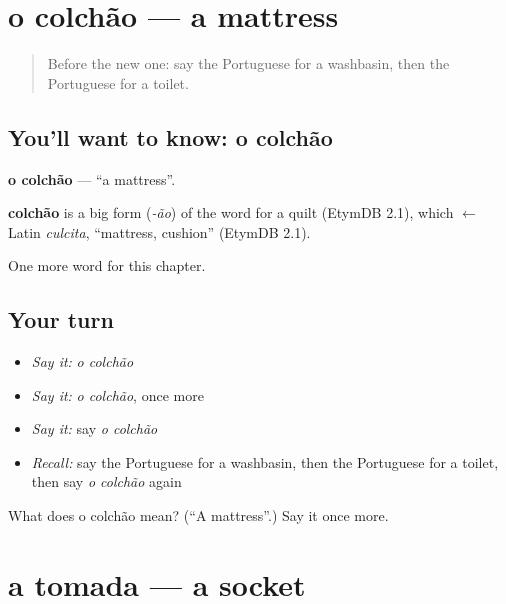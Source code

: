 \section[o colchão]{o colchão — a mattress}

\label{lesson:PT-C229-colchao}



\begin{quote}
Before the new one: say the Portuguese for a washbasin, then the Portuguese for a toilet.
\end{quote}

\subsection*{You'll want to know: o colchão}
\textbf{o colchão} — \textquotedblleft{}a mattress\textquotedblright{}.

\begin{cousinweb}
\textbf{colchão} is a big form (\emph{-ão}) of the word for a quilt (EtymDB 2.1), which $\leftarrow$ Latin \emph{culcita}, \textquotedblleft{}mattress, cushion\textquotedblright{} (EtymDB 2.1).
\end{cousinweb}

\begin{grammarlens}[title={What you've built}]
One more word for this chapter.
\end{grammarlens}

\subsection*{Your turn}
\begin{itemize}
\raggedright
  \item \emph{Say it:} \emph{o colchão}
  \item \emph{Say it:} \emph{o colchão}, once more
  \item \emph{Say it:} say \emph{o colchão}
  \item \emph{Recall:} say the Portuguese for a washbasin, then the Portuguese for a toilet, then say \emph{o colchão} again
\end{itemize}

\begin{tcolorbox}[breakable,colback=teal!4,colframe=teal!35!black,title={Before you move on}]
What does o colchão mean? (\textquotedblleft{}A mattress\textquotedblright{}.) Say it once more.
\end{tcolorbox}
\section[a tomada]{a tomada — a socket}

